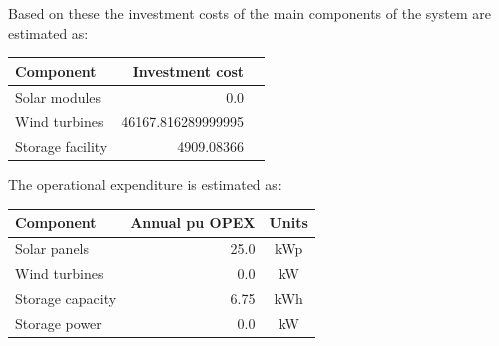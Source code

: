 \documentclass{article}
\begin{document}
\begin{multicols*}{2}
Based on these the investment costs of the main components of the system are estimated as:

\begin{center}

\begin{tabular}{|l|r|c|}

\hline Component&Investment cost\\ \hline 

Solar modules&0.0\\ 

Wind turbines&46167.816289999995\\ 

Storage facility&4909.08366\\ 

\hline

\end{tabular}

\label{tab:investtable}

\end{center}


\vspace{2.5mm}

The operational expenditure is estimated as:

\begin{center}

\begin{tabular}{|l|r|c|}

\hline Component&Annual pu OPEX&Units\\ \hline 

Solar panels&25.0&kWp\\ 

Wind turbines&0.0&kW\\ 

Storage capacity&6.75&kWh\\ 

Storage power&0.0&kW\\ 

\hline

\end{tabular}

\label{tab:opextable}

\end{center}


\vspace{2.5mm}




\end{multicols*}
\end{document}
